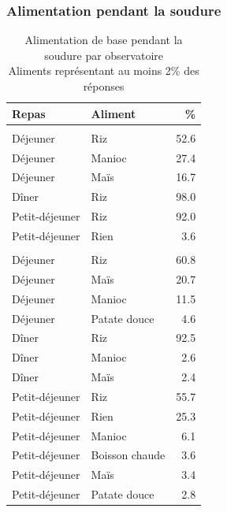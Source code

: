 \documentclass[
  french,
  letterpaper,
]{report}
\begin{document}
\subsubsection{Alimentation pendant la
soudure}\label{alimentation-pendant-la-soudure}

\begin{table}
\caption*{
{\fontsize{20}{25}\selectfont  Alimentation de base pendant la soudure par observatoire\fontsize{12}{15}\selectfont } \\ 
{\fontsize{14}{17}\selectfont  Aliments représentant au moins 2\% des réponses\fontsize{12}{15}\selectfont }
} 
\fontsize{12.0pt}{14.0pt}\selectfont
\begin{tabular*}{\linewidth}{@{\extracolsep{\fill}}llr}
\toprule
{\bfseries Repas} & {\bfseries Aliment} & \% \\ 
\midrule\addlinespace[2.5pt]
\multicolumn{3}{l}{Alaotra} \\[2.5pt] 
\midrule\addlinespace[2.5pt]
Déjeuner & Riz & 52.6 \\ 
Déjeuner & Manioc & 27.4 \\ 
Déjeuner & Maïs & 16.7 \\ 
Dîner & Riz & 98.0 \\ 
Petit-déjeuner & Riz & 92.0 \\ 
Petit-déjeuner & Rien & 3.6 \\ 
\midrule\addlinespace[2.5pt]
\multicolumn{3}{l}{Marovoay} \\[2.5pt] 
\midrule\addlinespace[2.5pt]
Déjeuner & Riz & 60.8 \\ 
Déjeuner & Maïs & 20.7 \\ 
Déjeuner & Manioc & 11.5 \\ 
Déjeuner & Patate douce & 4.6 \\ 
Dîner & Riz & 92.5 \\ 
Dîner & Manioc & 2.6 \\ 
Dîner & Maïs & 2.4 \\ 
Petit-déjeuner & Riz & 55.7 \\ 
Petit-déjeuner & Rien & 25.3 \\ 
Petit-déjeuner & Manioc & 6.1 \\ 
Petit-déjeuner & Boisson chaude & 3.6 \\ 
Petit-déjeuner & Maïs & 3.4 \\ 
Petit-déjeuner & Patate douce & 2.8 \\ 
\bottomrule
\end{tabular*}
\end{table}
\end{document}
